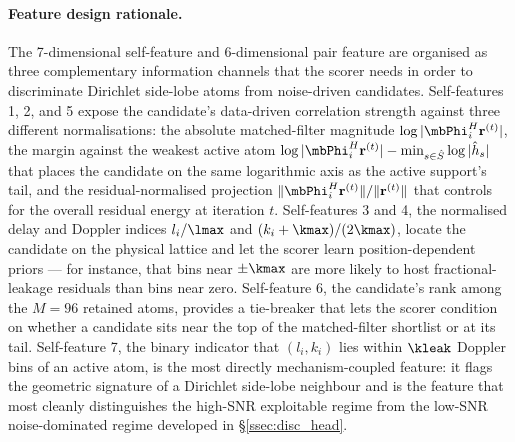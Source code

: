 
\paragraph{Feature design rationale.}
The 7-dimensional self-feature and 6-dimensional pair feature are organised as three complementary information channels that the scorer needs in order to discriminate Dirichlet side-lobe atoms from noise-driven candidates. Self-features 1, 2, and 5 expose the candidate's data-driven correlation strength against three different normalisations: the absolute matched-filter magnitude $\log|\mbPhi_i^H \mathbf{r}^{(t)}|$, the margin against the weakest active atom $\log|\mbPhi_i^H \mathbf{r}^{(t)}| - \min_{s \in \hat{S}} \log|\hat{h}_s|$ that places the candidate on the same logarithmic axis as the active support's tail, and the residual-normalised projection $\|\mbPhi_i^H \mathbf{r}^{(t)}\|/\|\mathbf{r}^{(t)}\|$ that controls for the overall residual energy at iteration $t$. Self-features 3 and 4, the normalised delay and Doppler indices $l_i / \lmax$ and $(k_i + \kmax)/(2\kmax)$, locate the candidate on the physical lattice and let the scorer learn position-dependent priors --- for instance, that bins near $\pm \kmax$ are more likely to host fractional-leakage residuals than bins near zero. Self-feature 6, the candidate's rank among the $M = 96$ retained atoms, provides a tie-breaker that lets the scorer condition on whether a candidate sits near the top of the matched-filter shortlist or at its tail. Self-feature 7, the binary indicator that $(l_i, k_i)$ lies within $\kleak$ Doppler bins of an active atom, is the most directly mechanism-coupled feature: it flags the geometric signature of a Dirichlet side-lobe neighbour and is the feature that most cleanly distinguishes the high-SNR exploitable regime from the low-SNR noise-dominated regime developed in \S\ref{ssec:disc_head}.

